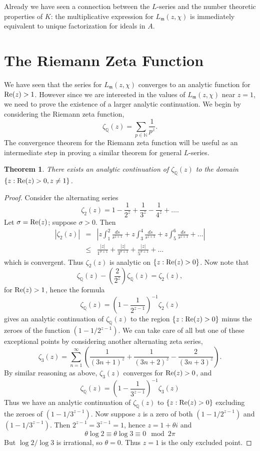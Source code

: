 \documentclass{amsart}
\def\QQ{{\mathbb Q}}
\def\mf{\mathfrak}
\def\NN{\mathbb{N}}
\def\Re{\textnormal{Re}}
\newtheorem{theorem}{Theorem}[section]
\theoremstyle{definition}
\theoremstyle{remark}
\begin{document}
Already we have seen a connection between the $L$-series and the
number theoretic properties of $K$: the multiplicative expression
for $L_\mf{m} (z, \chi)$ is immediately equivalent to unique
factorization for ideals in $A$.

\section{The Riemann Zeta Function}

\label{riemann}

We have seen that the series for $L_\mf{m} (z, \chi)$ converges
to an analytic function for $\Re(z) > 1$.  However since we are
interested in the values of $L_\mf{m} (z, \chi)$ near $z = 1$, we
need to prove the existence of a larger analytic continuation. We
begin by considering the Riemann zeta function,
\[
\zeta_\QQ(z) = \sum_{p \in \NN} \frac{1}{p^z}.
\]
The convergence theorem for the Riemann zeta function will be
useful as an intermediate step in proving a similar theorem for
general $L$-series.
\begin{theorem}
There exists an analytic continuation of $\zeta_\QQ(z)$ to the
domain $\{ z : \Re(z) > 0, z \neq 1 \}$.
\end{theorem}
\begin{proof}
Consider the alternating series
\[
\zeta_2(z) = 1 - \frac{1}{2^z} + \frac{1}{3^z} - \frac{1}{4^z} +
\ldots .
\]
Let $\sigma = \Re(z)$; suppose $\sigma > 0$.  Then
\begin{eqnarray*}
\left| \zeta_2(z) \right| & = & \left | z \int_1^2
\frac{ds}{s^{z+1}} + z \int_3^4 \frac{ds}{s^{z+1}} + z \int_5^6
\frac{ds}{s^{z+1}} + \ldots \right| \\
& \leq & \frac{|z|}{1^{\sigma + 1}} + \frac{|z|}{3^{\sigma + 1}} +
\frac{|z|}{5^{\sigma + 1}} + \ldots
\end{eqnarray*}
which is convergent.  Thus $\zeta_2(z)$ is analytic on $\{ z :
\Re(z) > 0 \}$.  Now note that
\[
\zeta_\QQ(z) - \left( \frac{2}{2^z} \right) \zeta_\QQ(z) =
\zeta_2(z),
\]
for $\Re(z) > 1$, hence the formula
\[
\zeta_\QQ(z) = \left( 1 - \frac{1}{2^{z-1}} \right)^{-1}
\zeta_2(z)
\]
gives an analytic continuation of $\zeta_\QQ(z)$ to the region
$\{ z : \Re(z) > 0 \}$ minus the zeroes of the function $\left( 1
- 1/2^{z-1} \right)$.  We can take care of all but one of these
exceptional points by considering another alternating zeta series,
\[
\zeta_3(z) = \sum_{n=1}^\infty \left( \frac{1}{(3n + 1)^z} +
\frac{1}{(3n + 2)^z} - \frac{2}{(3n + 3)^z} \right).
\]
By similar reasoning as above, $\zeta_3(z)$ converges for $\Re(z)
> 0$, and
\[
\zeta_\QQ(z) = \left( 1 - \frac{1}{3^{z-1}} \right)^{-1}
\zeta_3(z)
\]
Thus we have an analytic continuation of $\zeta_\QQ(z)$ to $\{ z
: \Re(z) > 0 \}$ excluding the zeroes of $\left( 1 - 1/3^{z-1}
\right)$. Now suppose $z$ is a zero of both $\left( 1 - 1/2^{z-1}
\right)$ and $\left(1 - 1/3^{z-1} \right)$.  Then $2^{z-1} =
3^{z-1} = 1$, hence $z = 1 + \theta i$ and
\[
\theta \log 2 \equiv \theta \log 3 \equiv 0 \mod 2 \pi
\]
But $\log 2 / \log 3$ is irrational, so $\theta = 0$.  Thus $z =
1$ is the only excluded point.
\end{proof}
\end{document}
